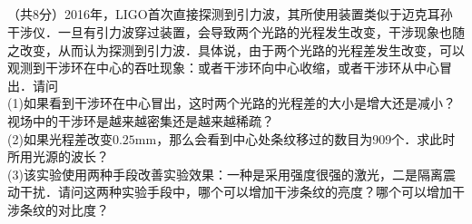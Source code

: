 \subsection{ }
（共8分）2016年，LIGO首次直接探测到引力波，其所使用装置类似于迈克耳孙干涉仪．一旦有引力波穿过装置，会导致两个光路的光程发生改变，干涉现象也随之改变，从而认为探测到引力波．具体说，由于两个光路的光程差发生改变，可以观测到干涉环在中心的吞吐现象：或者干涉环向中心收缩，或者干涉环从中心冒出．请问\\
(1)如果看到干涉环在中心冒出，这时两个光路的光程差的大小是增大还是减小？视场中的干涉环是越来越密集还是越来越稀疏？\\
(2)如果光程差改变$0.25\mathrm{mm}$，那么会看到中心处条纹移过的数目为909个．求此时所用光源的波长？\\
(3)该实验使用两种手段改善实验效果：一种是采用强度很强的激光，二是隔离震动干扰．请问这两种实验手段中，哪个可以增加干涉条纹的亮度？哪个可以增加干涉条纹的对比度？